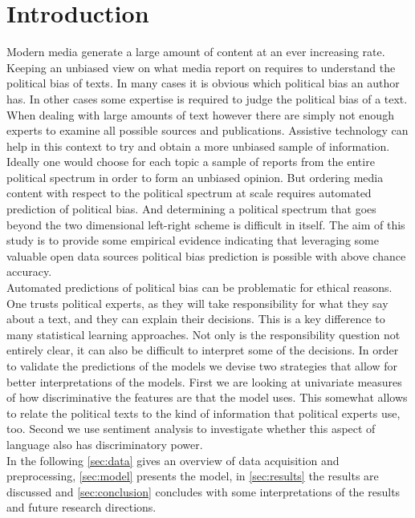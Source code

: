 \documentclass[runningheads,a4paper]{llncs}
\begin{document}
\section{Introduction}
\label{sec:intro}
%
Modern media generate a large amount of content at an ever increasing rate. Keeping an unbiased view on what media report on requires to understand the political bias of texts. In many cases it is obvious which political bias an author has. In other cases some expertise is required to judge the political bias of a text. 
%
When dealing with large amounts of text however there are simply not enough experts to examine all possible sources and publications. Assistive technology can help in this context to try and obtain a more unbiased sample of information. \\

Ideally one would choose for each topic a sample of reports from the entire political spectrum in order to form an unbiased opinion. But ordering media content with respect to the political spectrum at scale requires automated prediction of political bias. And determining a political spectrum that goes beyond the two dimensional left-right scheme is difficult in itself. The aim of this study is to provide some empirical evidence indicating that leveraging some valuable open data sources political bias prediction is possible with above chance accuracy. \\


Automated predictions of political bias can be problematic for ethical reasons. One trusts political experts, as they will take responsibility for what they say about a text, and they can explain their decisions. This is a key difference to many statistical learning approaches. Not only is the responsibility question not entirely clear, it can also be difficult to interpret some of the decisions. In order to validate the predictions of the models we devise two strategies that allow for better interpretations of the models. First we are looking at univariate measures of how discriminative the features are that the model uses. This somewhat allows to relate the political texts to the kind of information that political experts use, too. Second we use sentiment analysis to investigate whether this aspect of language also has discriminatory power. \\


In the following \autoref{sec:data} gives an overview of data acquisition and preprocessing, \autoref{sec:model} presents the model, in \autoref{sec:results} the results are discussed and \autoref{sec:conclusion} concludes with some interpretations of the results and future research directions. 
\end{document}
